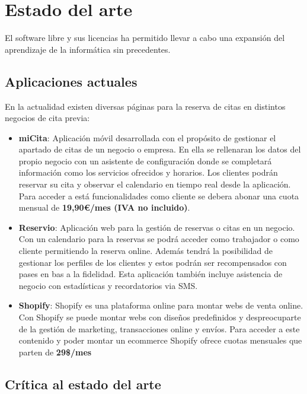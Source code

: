\chapter{Estado del arte}

El software libre y sus licencias \cite{gplv3} ha permitido llevar a cabo una expansión del
aprendizaje de la informática sin precedentes.

\section{Aplicaciones actuales}

En la actualidad existen diversas páginas para la reserva de citas en distintos negocios de cita previa:

\vspace{-0.5em}
\begin{itemize}
    \item \textbf{miCita}: Aplicación móvil desarrollada con el propósito de gestionar el apartado de citas de un
    negocio o empresa. En ella se rellenaran los datos del propio negocio con un asistente de configuración donde
    se completará información como los servicios ofrecidos y horarios. Los clientes podrán reservar su cita y
    observar el calendario en tiempo real desde la aplicación. Para acceder a está funcionalidades como cliente
    se debera abonar una cuota mensual de \textbf{19,90\euro/mes (IVA no incluido)}.\cite{micita}

    \item \textbf{Reservio}: Aplicación web para la gestión de reservas o citas en un negocio.
    Con un calendario para la reservas se podrá acceder como trabajador o como cliente permitiendo la reserva online.
    Además tendrá la posibilidad de gestionar los perfiles de los clientes  y estos podrán ser recompensados
    con pases en bas a la fidelidad. Esta aplicación también incluye asistencia de negocio con estadísticas y
    recordatorios via SMS.\cite{reservio}

    \item \textbf{Shopify}: Shopify es una plataforma online para montar webs de venta online. Con Shopify se puede
    montar webs con diseños predefinidos y despreocuparte de la gestión de marketing, transacciones online
    y envíos. Para acceder a este contenido y poder montar un ecommerce Shopify ofrece cuotas mensuales que parten de
    \textbf{29\$/mes}\cite{shopify}
\end{itemize}

\section{Crítica al estado del arte}

